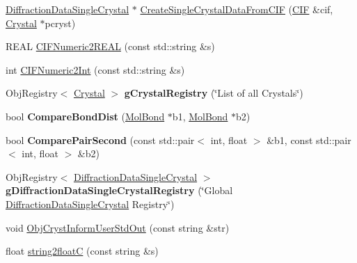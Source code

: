 \begin{DoxyCompactItemize}
\item 
\mbox{\hyperlink{class_obj_cryst_1_1_diffraction_data_single_crystal}{Diffraction\+Data\+Single\+Crystal}} $\ast$ \mbox{\hyperlink{namespace_obj_cryst_a336ceab5acf3427d69f799599e47a976}{Create\+Single\+Crystal\+Data\+From\+C\+IF}} (\mbox{\hyperlink{class_obj_cryst_1_1_c_i_f}{C\+IF}} \&cif, \mbox{\hyperlink{class_obj_cryst_1_1_crystal}{Crystal}} $\ast$pcryst)
\item 
R\+E\+AL \mbox{\hyperlink{namespace_obj_cryst_a1c273a894c75226abfe29f4494fdb11d}{C\+I\+F\+Numeric2\+R\+E\+AL}} (const std\+::string \&s)
\item 
int \mbox{\hyperlink{namespace_obj_cryst_a9c498cb6e7dfbb2de295c6d0462ee67b}{C\+I\+F\+Numeric2\+Int}} (const std\+::string \&s)
\item 
\mbox{\label{namespace_obj_cryst_a5b0674770ecc6e63d8ed31d02416b965}} 
Obj\+Registry$<$ \mbox{\hyperlink{class_obj_cryst_1_1_crystal}{Crystal}} $>$ {\bfseries g\+Crystal\+Registry} (\char`\"{}List of all Crystals\char`\"{})
\item 
\mbox{\label{namespace_obj_cryst_a9bc712931333920d07218627b8b4908d}} 
bool {\bfseries Compare\+Bond\+Dist} (\mbox{\hyperlink{class_obj_cryst_1_1_mol_bond}{Mol\+Bond}} $\ast$b1, \mbox{\hyperlink{class_obj_cryst_1_1_mol_bond}{Mol\+Bond}} $\ast$b2)
\item 
\mbox{\label{namespace_obj_cryst_aa9a690e356468f2dc398bba4751019aa}} 
bool {\bfseries Compare\+Pair\+Second} (const std\+::pair$<$ int, float $>$ \&b1, const std\+::pair$<$ int, float $>$ \&b2)
\item 
\mbox{\label{namespace_obj_cryst_a3b1edb131fc64956ce06125d977c79f7}} 
Obj\+Registry$<$ \mbox{\hyperlink{class_obj_cryst_1_1_diffraction_data_single_crystal}{Diffraction\+Data\+Single\+Crystal}} $>$ {\bfseries g\+Diffraction\+Data\+Single\+Crystal\+Registry} (\char`\"{}Global \mbox{\hyperlink{class_obj_cryst_1_1_diffraction_data_single_crystal}{Diffraction\+Data\+Single\+Crystal}} Registry\char`\"{})
\item 
void \mbox{\hyperlink{namespace_obj_cryst_a9aa5136f02bf658a273ece563304fc03}{Obj\+Cryst\+Inform\+User\+Std\+Out}} (const string \&str)
\item 
float \mbox{\hyperlink{namespace_obj_cryst_a5c248549d929fc199e6323d2a1486177}{string2floatC}} (const string \&s)

\end{DoxyCompactItemize}
